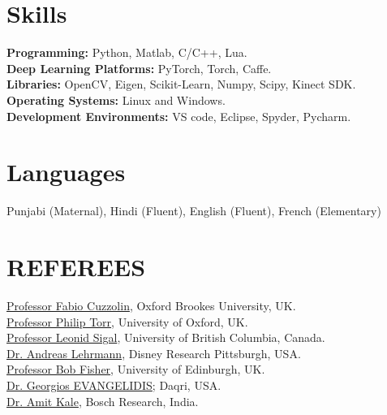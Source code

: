 \documentclass[line, margin]{res}
\begin{document}
\begin{resume}
\section{Skills}
\textbf{Programming: } Python, Matlab, C/C++, Lua.\\
\textbf{Deep Learning Platforms:} PyTorch, Torch, Caffe. \\
\textbf{Libraries:} OpenCV, Eigen, Scikit-Learn, Numpy, Scipy, Kinect SDK.\\
\textbf{Operating Systems:} Linux and Windows.\\
\textbf{Development Environments:} VS code, Eclipse, Spyder, Pycharm.

\section{Languages}
Punjabi (Maternal), Hindi (Fluent), English (Fluent), French (Elementary)\\

\section{REFEREES}
\href{http://cms.brookes.ac.uk/staff/FabioCuzzolin/}{Professor Fabio Cuzzolin}, Oxford Brookes University, UK.\\
\href{http://www.robots.ox.ac.uk/~phst/}{Professor Philip Torr}, University of Oxford, UK.\\
\href{https://www.cs.ubc.ca/~lsigal/}{Professor Leonid Sigal}, University of British Columbia, Canada.\\
\href{https://ps.is.tuebingen.mpg.de/person/alehrmann}{Dr. Andreas Lehrmann}, Disney Research Pittsburgh, USA.\\
\href{http://homepages.inf.ed.ac.uk/rbf/}{Professor Bob Fisher}, University of Edinburgh, UK.\\
\href{https://team.inria.fr/perception/team-members/evangelidis/}{Dr. Georgios EVANGELIDIS}; Daqri, USA.\\
\href{http://www.cfar.umd.edu/~kale/}{Dr. Amit Kale}, Bosch Research, India.

\end{resume}
\end{document}
